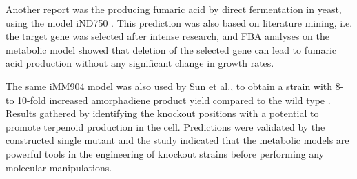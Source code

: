 Another report was the producing fumaric acid by direct fermentation in yeast, using the model iND750 \cite{xu2012fumaric}. This prediction was also based on literature mining, i.e. the target gene was selected after intense research, and FBA analyses on the metabolic model showed that deletion of the selected gene can lead to fumaric acid production without any significant change in growth rates.

The same iMM904 model was also used by Sun et al., to obtain a strain with 8- to 10-fold increased amorphadiene product yield compared to the wild type \cite{sun2014identification}. Results gathered by identifying the knockout positions with a potential to promote terpenoid production in the cell. Predictions were validated by the constructed single mutant and the study indicated that the metabolic models are powerful tools in the engineering of knockout strains before performing any molecular manipulations.
